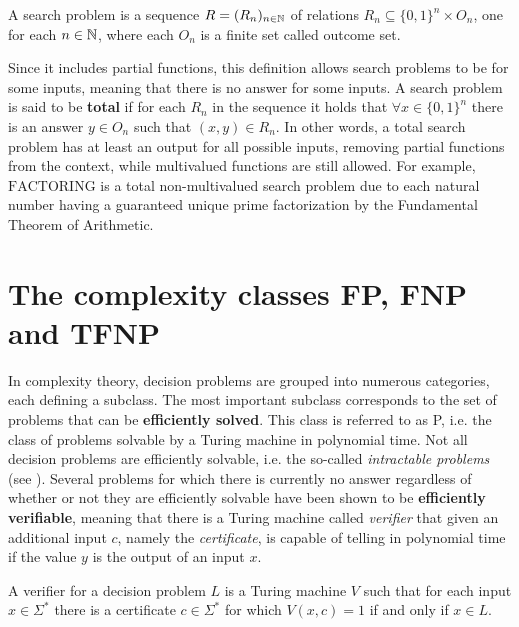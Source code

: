 \begin{definition}
 A search problem is a sequence $R = (R_n)_{n \in \mathbb{N}}$ of relations $R_n \subseteq \{0,1\}^n \times O_n$, one for each $n \in \mathbb{N}$, where each $O_n$ is a finite set called outcome set.
\end{definition}

Since it includes partial functions, this definition allows search problems to be  for some inputs, meaning that there is no answer for some inputs. A search problem is said to be \textbf{total} if for each $R_n$ in the sequence it holds that $\forall x \in \{0,1\}^n$ there is an answer $y \in O_n$ such that $(x,y) \in R_n$. In other words, a total search problem has at least an output for all possible inputs, removing partial functions from the context, while multivalued functions are still allowed. For example, $\mathrm{FACTORING}$ is a total non-multivalued search problem due to each natural number having a guaranteed unique prime factorization by the Fundamental Theorem of Arithmetic.

\newpage

\section{The complexity classes \textsf{FP}, \textsf{FNP} and \textsf{TFNP}}

In complexity theory, decision problems are grouped into numerous categories, each defining a subclass. The most important subclass corresponds to the set of problems that can be \textbf{efficiently solved}. This class is referred to as \textsf{P}, i.e. the class of problems solvable by a Turing machine in polynomial time. Not all decision problems are efficiently solvable, i.e. the so-called \textit{intractable problems} (see ). Several problems for which there is currently no answer regardless of whether or not they are efficiently solvable have been shown to be \textbf{efficiently verifiable}, meaning that there is a Turing machine called \textit{verifier} that given an additional input $c$, namely the \textit{certificate}, is capable of telling in polynomial time if the value $y$ is the output of an input $x$.

\begin{definition}
 A verifier for a decision problem $L$ is a Turing machine $V$ such that for each input $x \in \Sigma^*$ there is a certificate $c \in \Sigma^*$ for which $V(x,c) = 1$ if and only if $x \in L$.
\end{definition}

